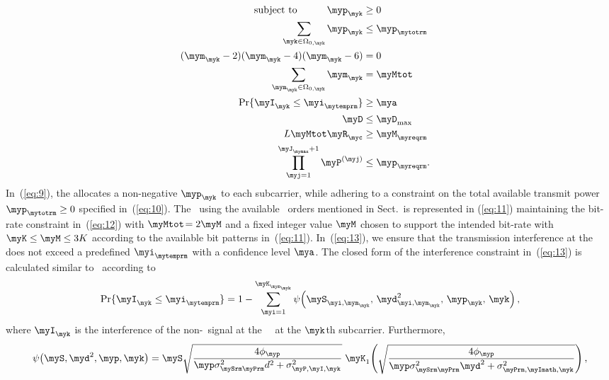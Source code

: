 \begin{align}\hspace{2.5cm}
    \text{subject to}\qquad\quad 
    \myp_\myk &\ge 0                                   
        && \label{eq:9} \\
    \sum_{\myk\in\Omega_{0,\myk}} \myp_\myk &\le \myp_{\mytotrm}      
        && \label{eq:10} \\
    (\mym_\myk - 2)(\mym_\myk - 4)(\mym_\myk - 6) &= 0            
        && \label{eq:11} \\
    \sum_{\mym_\myk\in\Omega_{0,\myk}} \mym_\myk &= \myMtot      
        && \label{eq:12} \\
    \Pr\{\myI_\myk \le \myi_{\mytemprm}\} &\ge \mya
        && \label{eq:13} \\
    \myD &\le \myD_{\max}                             
        && \label{eq:14} \\
    L\myMtot \myR_\myc &\ge \myM_{\myreqrm} 
        && \label{eq:15} \\
    \prod_{\myj=1}^{\myJ_{\mymax}+1} \myP^{(\myj)} &\le \myp_{\myreqrm}.
        && \label{eq:16}
\end{align}
In~(\ref{eq:9}), the \myCLO{} allocates a non-negative $\myp_\myk$ to each subcarrier,
while adhering to a constraint on the total available \mySU{} \myTX{}
transmit power $\myp_{\mytotrm} \ge 0$ specified in~(\ref{eq:10}). The \myBL\ using the available \myQAM\ orders mentioned in Sect.\myII\ is represented in (\ref{eq:11}) maintaining the bit-rate constraint in~\!(\ref{eq:12}) with \!$\myMtot\!=2\myM$ and a fixed integer value $\myM$ chosen to support the intended
bit-rate with $\myK \le \myM \le 3K$ according to the available bit
patterns in~(\ref{eq:11}). In~(\ref{eq:13}), we ensure that the \mySU{} transmission
interference at the \myPU{} \myRX{} does not exceed a predefined $\myi_{\mytemprm}$
with a confidence level $\mya$. The closed form of the interference
constraint in~(\ref{eq:13}) is calculated similar to~\cite{Mansour2018_alt} according to
\begin{equation*}
\Pr\{\myI_\myk \le \myi_{\mytemprm}\}
    = 1 - \sum_{\myi=1}^{\myK_{\mym_\myk}}
        \psi\!\left(\myS_{\myi,\mym_\myk},\, \myd^{2}_{\myi,\mym_\myk},\, \myp_\myk,\, \myk\right) ,
\end{equation*}
where $\myI_\myk$ is the interference of the non-\myPU\ signal at the \myPU\ \myRX\ at the $\myk$th subcarrier. Furthermore,
{\small
\begin{equation*}
\psi\!\left(\myS, \myd^2, \myp, \myk\right)
= \myS \sqrt{\frac{4\phi_{\myp}}{\myp \sigma_{\mySrm\myPrm}^{2} d^{2}
    + \sigma_{\mathrm{\myP,\myI},\myk}^{2}}}\;
\myK_{1}\!\left(
        \sqrt{\frac{4\phi_{\myp}}{
        \myp \sigma_{\mySrm\myPrm}^{2} \myd^{2}
        + \sigma_{\myPrm,\myImath,\myk}^{2}}}
     \right),
\end{equation*}
}
